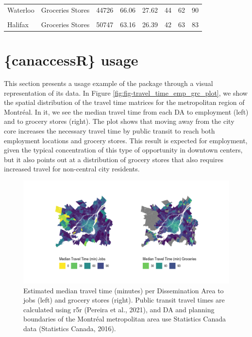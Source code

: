 \documentclass[Royal,times,sageh]{sagej}
\begin{document}
\begin{table}
{\begin{tabular}[t]{llrrrrrr}
Waterloo & Groceries Stores & 44726 & 66.06 & 27.62 & 44 & 62 & 90\\
\cellcolor{gray!10}{London} & \cellcolor{gray!10}{Groceries Stores} & \cellcolor{gray!10}{52617} & \cellcolor{gray!10}{55.48} & \cellcolor{gray!10}{19.26} & \cellcolor{gray!10}{42} & \cellcolor{gray!10}{55} & \cellcolor{gray!10}{67}\\
\addlinespace
Halifax & Groceries Stores & 50747 & 63.16 & 26.39 & 42 & 63 & 83\\
\bottomrule
\end{tabular}}
\end{table}

\section{\{canaccessR\} usage}\label{canaccessr-usage}

This section presents a usage example of the package through a visual
representation of its data. In Figure
\ref{fig:fig-travel_time_emp_grc_plot}, we show the spatial distribution
of the travel time matrices for the metropolitan region of Montréal. In
it, we see the median travel time from each DA to employment (left) and
to grocery stores (right). The plot shows that moving away from the city
core increases the necessary travel time by public transit to reach both
employment locations and grocery stores. This result is expected for
employment, given the typical concentration of this type of opportunity
in downtown centers, but it also points out at a distribution of grocery
stores that also requires increased travel for non-central city
residents.

\begin{figure}[H]
\includegraphics[width=1\linewidth]{../figures/patch_tt_emp_grc} \caption{\label{fig:fig-travel_time_emp_grc_plot}Estimated median travel time (minutes) per Dissemination Area to jobs (left) and grocery stores (right). Public transit travel times are calculated using {r5r} (Pereira et al., 2021), and DA and planning boundaries of the Montréal metropolitan area use Statistics Canada data (Statistics Canada, 2016).}\label{fig:unnamed-chunk-2}
\end{figure}
\end{document}
